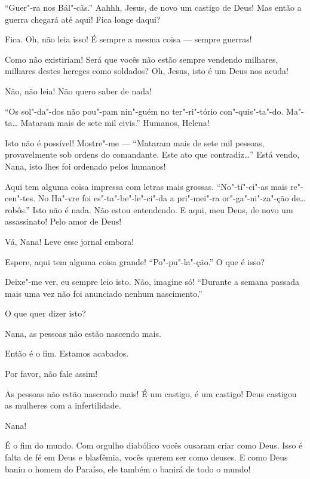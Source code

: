   ``Guer"-ra nos Bál"-cãs.'' Aahhh, Jesus, de novo um castigo
de Deus! Mas então a guerra chegará até aqui! Fica longe daqui?

 Fica. Oh, não leia isso! É sempre a mesma coisa --- sempre guerras!

 Como não existiriam! Será que vocês não estão sempre vendendo milhares,
milhares destes hereges como soldados? Oh, Jesus, isto é um Deus nos acuda!

 Não, não leia! Não quero saber de nada!

  ``Os sol"-da"-dos não pou"-pam nin"-guém no ter"-ri"-tório
con"-quis"-ta"-do. Ma"-ta\ldots{} Mataram mais de sete mil civis.'' Humanos, Helena!

 Isto não é possível! Mostre"-me --- 
``Mataram mais de sete mil pessoas, provavelmente sob ordens do comandante. Este
ato que contradiz\ldots{}” Está vendo, Nana, isto lhes foi ordenado pelos humanos!

 Aqui tem alguma coisa impressa com letras mais grossas. ``No"-tí"-ci"-as mais
re"-cen"-tes. No Ha"-vre foi es"-ta"-be"-le"-ci"-da a pri"-mei"-ra or"-ga"-ni"-za"-ção de\ldots{}
robôs.'' Isto não é nada. Não estou entendendo. E aqui, meu Deus, de novo um
assassinato! Pelo amor de Deus!

 Vá, Nana! Leve esse jornal embora!

 Espere, aqui tem alguma coisa grande! ``Po"-pu"-la"-ção.'' O que é isso?

 Deixe"-me ver, eu sempre leio isto.  Não, imagine
só!  “Durante a semana passada mais uma vez não foi anunciado nenhum
nascimento.'' 

 O que quer dizer isto?

 Nana, as pessoas não estão nascendo mais.

  Então é o fim. Estamos acabados.

 Por favor, não fale assim!

 As pessoas não estão nascendo mais! É um castigo, é um castigo! Deus
castigou as mulheres com a infertilidade.

  Nana!

  É o fim do mundo. Com orgulho diabólico vocês ousaram
criar como Deus. Isso é falta de fé em Deus e blasfêmia, vocês querem ser como
deuses. E como Deus baniu o homem do Paraíso, ele também o banirá de todo o
mundo!

